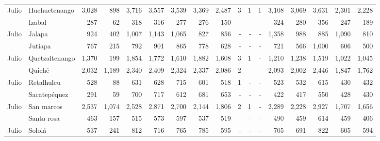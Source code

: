 \begin{landscape}
\begin{center}
\begin{longtable}{llrrrrrrrrrrrrrrr}
			\multicolumn{1}{l}{	\footnotesize	 Julio 	}&	 Huehuetenango 	&	 3,028 	&	 898 	&	 3,716 	&	 3,557 	&	 3,539 	&	 3,369 	&	 2,487 	&	 3 	&	 1 	&	 1 	&	 3,108 	&	 3,069 	&	 3,631 	&	 2,301 	&	 2,228 	\\
			\rowcolor{color1!5!white}\multicolumn{1}{l}{	\footnotesize	 Julio 	}&	 Izabal 	&	 287 	&	 62 	&	 318 	&	 316 	&	 277 	&	 276 	&	 150 	&	 -   	&	 -   	&	 -   	&	 324 	&	 280 	&	 356 	&	 247 	&	 189 	\\
			\multicolumn{1}{l}{	\footnotesize	 Julio 	}&	 Jalapa 	&	 924 	&	 402 	&	 1,007 	&	 1,143 	&	 1,065 	&	 827 	&	 856 	&	 -   	&	 -   	&	 -   	&	 1,358 	&	 988 	&	 885 	&	 1,090 	&	 810 	\\
			\rowcolor{color1!5!white}\multicolumn{1}{l}{	\footnotesize	 Julio 	}&	 Jutiapa 	&	 767 	&	 215 	&	 792 	&	 901 	&	 865 	&	 778 	&	 628 	&	 -   	&	 -   	&	 -   	&	 721 	&	 566 	&	 1,000 	&	 606 	&	 500 	\\
			\multicolumn{1}{l}{	\footnotesize	 Julio 	}&	 Quetzaltenango 	&	 1,370 	&	 199 	&	 1,854 	&	 1,772 	&	 1,610 	&	 1,882 	&	 1,608 	&	 3 	&	 1 	&	 -   	&	 1,210 	&	 1,238 	&	 1,519 	&	 1,022 	&	 1,045 	\\
			\rowcolor{color1!5!white}\multicolumn{1}{l}{	\footnotesize	 Julio 	}&	 Quiché 	&	 2,032 	&	 1,189 	&	 2,340 	&	 2,409 	&	 2,324 	&	 2,337 	&	 2,086 	&	 2 	&	 -   	&	 -   	&	 2,093 	&	 2,002 	&	 2,446 	&	 1,847 	&	 1,762 	\\
			\multicolumn{1}{l}{	\footnotesize	 Julio 	}&	 Retalhuleu 	&	 528 	&	 88 	&	 631 	&	 628 	&	 715 	&	 601 	&	 518 	&	 1 	&	 -   	&	 -   	&	 523 	&	 532 	&	 615 	&	 430 	&	 432 	\\
			\rowcolor{color1!5!white}\multicolumn{1}{l}{	\footnotesize	 Julio 	}&	 Sacatepéquez 	&	 291 	&	 59 	&	 700 	&	 717 	&	 612 	&	 681 	&	 653 	&	 -   	&	 -   	&	 -   	&	 422 	&	 417 	&	 550 	&	 428 	&	 430 	\\
			\multicolumn{1}{l}{	\footnotesize	 Julio 	}&	 San marcos 	&	 2,537 	&	 1,074 	&	 2,528 	&	 2,871 	&	 2,700 	&	 2,144 	&	 1,806 	&	 2 	&	 1 	&	 -   	&	 2,289 	&	 2,228 	&	 2,927 	&	 1,707 	&	 1,656 	\\
			\rowcolor{color1!5!white}\multicolumn{1}{l}{	\footnotesize	 Julio 	}&	 Santa rosa 	&	 463 	&	 157 	&	 515 	&	 573 	&	 597 	&	 537 	&	 519 	&	 -   	&	 -   	&	 -   	&	 490 	&	 459 	&	 614 	&	 459 	&	 406 	\\
			\multicolumn{1}{l}{	\footnotesize	 Julio 	}&	 Sololá 	&	 537 	&	 241 	&	 812 	&	 716 	&	 765 	&	 785 	&	 595 	&	 -   	&	 -   	&	 -   	&	 705 	&	 691 	&	 822 	&	 605 	&	 594 	\\

\end{longtable}
\end{center}
\end{landscape}
